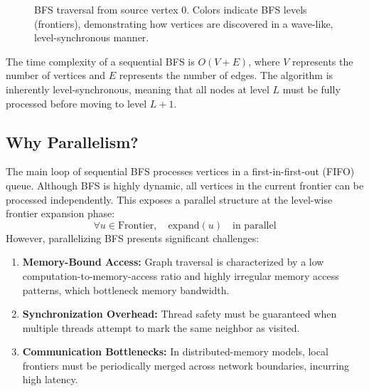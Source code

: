 \documentclass[12pt, a4paper]{article}
\begin{document}
\begin{figure}[H]
\centering
{}
\caption{BFS traversal from source vertex 0. Colors indicate BFS levels (frontiers), demonstrating how vertices are discovered in a wave-like, level-synchronous manner.}
\end{figure}

The time complexity of a sequential BFS is $O(V + E)$, where $V$ represents the number of vertices and $E$ represents the number of edges. The algorithm is inherently level-synchronous, meaning that all nodes at level $L$ must be fully processed before moving to level $L+1$.

\subsection{Why Parallelism?}
The main loop of sequential BFS processes vertices in a first-in-first-out (FIFO) queue. Although BFS is highly dynamic, all vertices in the current frontier can be processed independently. This exposes a parallel structure at the level-wise frontier expansion phase:
\begin{equation}
\forall u \in \text{Frontier}, \quad \text{expand}(u) \quad \text{in parallel}
\end{equation}
However, parallelizing BFS presents significant challenges:
\begin{enumerate}[leftmargin=*]
    \item \textbf{Memory-Bound Access:} Graph traversal is characterized by a low computation-to-memory-access ratio and highly irregular memory access patterns, which bottleneck memory bandwidth.
    \item \textbf{Synchronization Overhead:} Thread safety must be guaranteed when multiple threads attempt to mark the same neighbor as visited.
    \item \textbf{Communication Bottlenecks:} In distributed-memory models, local frontiers must be periodically merged across network boundaries, incurring high latency.
\end{enumerate}
\end{document}
